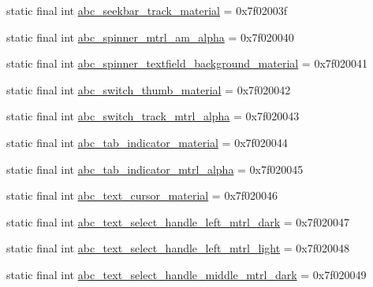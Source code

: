 \begin{CompactItemize}
\item 
static final int \hyperlink{classandroid_1_1support_1_1graphics_1_1drawable_1_1animated_1_1_r_1_1drawable_c92a952a4a59247f1bdd8dba31dab8ff}{abc\_\-seekbar\_\-track\_\-material} = 0x7f02003f
\item 
static final int \hyperlink{classandroid_1_1support_1_1graphics_1_1drawable_1_1animated_1_1_r_1_1drawable_5eb1a0bbc3b840ea4b667fa91570bac3}{abc\_\-spinner\_\-mtrl\_\-am\_\-alpha} = 0x7f020040
\item 
static final int \hyperlink{classandroid_1_1support_1_1graphics_1_1drawable_1_1animated_1_1_r_1_1drawable_de2179c32443301f990553569f64ad32}{abc\_\-spinner\_\-textfield\_\-background\_\-material} = 0x7f020041
\item 
static final int \hyperlink{classandroid_1_1support_1_1graphics_1_1drawable_1_1animated_1_1_r_1_1drawable_057baa5531d0092778446859aca8c018}{abc\_\-switch\_\-thumb\_\-material} = 0x7f020042
\item 
static final int \hyperlink{classandroid_1_1support_1_1graphics_1_1drawable_1_1animated_1_1_r_1_1drawable_f62b01ddb693985410326c17aaf34b27}{abc\_\-switch\_\-track\_\-mtrl\_\-alpha} = 0x7f020043
\item 
static final int \hyperlink{classandroid_1_1support_1_1graphics_1_1drawable_1_1animated_1_1_r_1_1drawable_b39a1c9a801b13be71040c213b8ad90a}{abc\_\-tab\_\-indicator\_\-material} = 0x7f020044
\item 
static final int \hyperlink{classandroid_1_1support_1_1graphics_1_1drawable_1_1animated_1_1_r_1_1drawable_a7e08d80364cfde04686a35b942ce2e0}{abc\_\-tab\_\-indicator\_\-mtrl\_\-alpha} = 0x7f020045
\item 
static final int \hyperlink{classandroid_1_1support_1_1graphics_1_1drawable_1_1animated_1_1_r_1_1drawable_54e7e4ee04376d281ea15aeaae4b8561}{abc\_\-text\_\-cursor\_\-material} = 0x7f020046
\item 
static final int \hyperlink{classandroid_1_1support_1_1graphics_1_1drawable_1_1animated_1_1_r_1_1drawable_6c294348dc19c0d6ffd26f7cc49fe89f}{abc\_\-text\_\-select\_\-handle\_\-left\_\-mtrl\_\-dark} = 0x7f020047
\item 
static final int \hyperlink{classandroid_1_1support_1_1graphics_1_1drawable_1_1animated_1_1_r_1_1drawable_9cf5ce8755780189ad5ce9aa82799c16}{abc\_\-text\_\-select\_\-handle\_\-left\_\-mtrl\_\-light} = 0x7f020048
\item 
static final int \hyperlink{classandroid_1_1support_1_1graphics_1_1drawable_1_1animated_1_1_r_1_1drawable_67f00b6aadae7576e4e6cb0fb770b220}{abc\_\-text\_\-select\_\-handle\_\-middle\_\-mtrl\_\-dark} = 0x7f020049

\end{CompactItemize}
